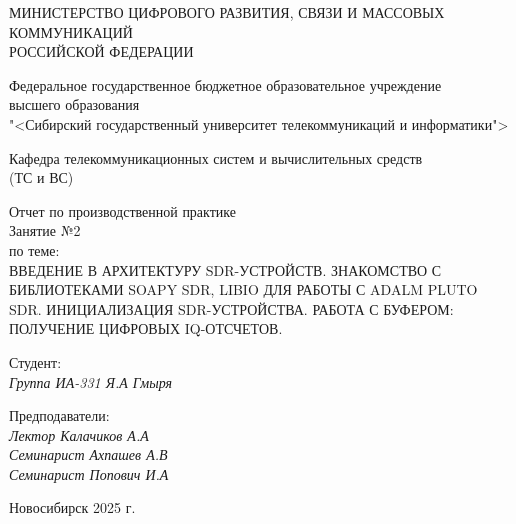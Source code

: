 \thispagestyle{empty}

\begin{center}
    МИНИСТЕРСТВО ЦИФРОВОГО РАЗВИТИЯ, СВЯЗИ И МАССОВЫХ КОММУНИКАЦИЙ \\ РОССИЙСКОЙ ФЕДЕРАЦИИ

    \vspace{20pt}

    Федеральное государственное бюджетное образовательное учреждение  \\  высшего образования \\
    "<Сибирский государственный университет телекоммуникаций и информатики"> \\

    \vspace{20pt}

    Кафедра телекоммуникационных систем и вычислительных средств \\  (ТС и ВС)
\end{center}

\vfill

\begin{center}
    Отчет по производственной практике \\  
    Занятие №2 \\
    
    \vspace{20pt}
    по теме: \\
    \uppercase{Введение в архитектуру SDR-устройств. Знакомство с библиотеками Soapy SDR, Libio для работы с Adalm Pluto SDR. 
    Инициализация SDR-устройства. Работа с буфером: получение цифровых IQ-отсчетов.}
\end{center}

\vfill

    \noindent Студент: \\
    \textit{Группа ИА-331 \hfill Я.А Гмыря}

    \vspace{20pt}

    \noindent Предподаватели: \\
    \textit{Лектор \hfill Калачиков А.А} \\
    \textit{Семинарист \hfill Ахпашев А.В} \\
    \textit{Семинарист \hfill Попович И.А}

\vfill

\begin{center}
    Новосибирск 2025 г.
\end{center}